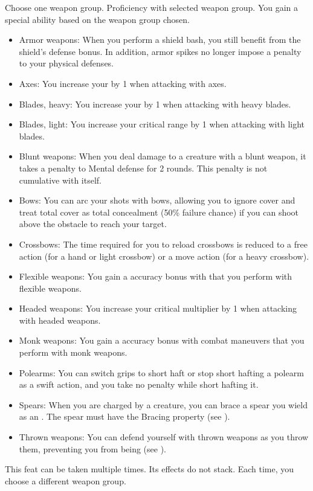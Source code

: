 Choose one weapon group.
\featpre Proficiency with selected weapon group.
\featben You gain a special ability based on the weapon group chosen.
\begin{itemize}
    \item Armor weapons: When you perform a shield bash, you still benefit from the shield's defense bonus.
        In addition, armor spikes no longer impose a penalty to your physical defenses.
    \item Axes: You increase your  by 1 when attacking with axes.
    \item Blades, heavy: You increase your  by 1 when attacking with heavy blades.
    \item Blades, light: You increase your critical range by 1 when attacking with light blades.
    \item Blunt weapons: When you deal damage to a creature with a blunt weapon, it takes a  penalty to Mental defense for 2 rounds.
        This penalty is not cumulative with itself.
    \item Bows: You can arc your shots with bows, allowing you to ignore cover and treat total cover as total concealment (50\% failure chance) if you can shoot above the obstacle to reach your target.
    \item Crossbows: The time required for you to reload crossbows is reduced to a free action (for a hand or light crossbow) or a move action (for a heavy crossbow).
    \item Flexible weapons: You gain a  accuracy bonus with  that you perform with flexible weapons.
    \item Headed weapons: You increase your critical multiplier by 1 when attacking with headed weapons.
    \item Monk weapons: You gain a  accuracy bonus with combat maneuvers that you perform with monk weapons.
    \item Polearms: You can switch grips to short haft or stop short hafting a polearm as a swift action, and you take no penalty while short hafting it.
    \item Spears: When you are charged by a creature, you can brace a spear you wield as an . The spear must have the Bracing property (see ).
    \item Thrown weapons: You can defend yourself with thrown weapons as you throw them, preventing you from being  (see ).
\end{itemize}
 This feat can be taken multiple times.
Its effects do not stack.
Each time, you choose a different weapon group.

